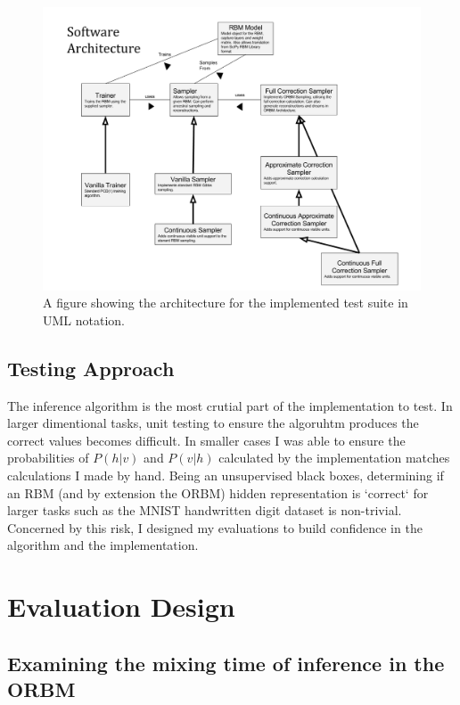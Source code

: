 \begin{figure}[h]
\begin{center}
  \includegraphics[width = 1\textwidth]{Assets/ENGR489-Architecture.png}
\caption{A figure showing the architecture for the implemented test suite in UML notation.}
\label{F:Prog-Arch}
\end{center}
\end{figure}

\subsection{Testing Approach}

The inference algorithm is the most crutial part of the implementation to test. In larger dimentional tasks, unit testing to ensure the algoruhtm produces the correct values becomes difficult. In smaller cases I was able to ensure the probabilities of $P(h|v)$ and $P(v|h)$ calculated by the implementation matches calculations I made by hand. Being an unsupervised black boxes, determining if an RBM (and by extension the ORBM) hidden representation is `correct` for larger tasks such as the MNIST handwritten digit dataset is non-trivial. Concerned by this risk, I designed my evaluations to build confidence in the algorithm and the implementation.

\section{Evaluation Design}

\subsection{Examining the mixing time of inference in the ORBM}

